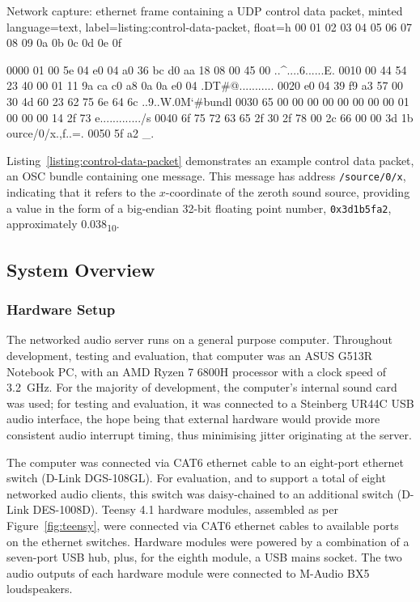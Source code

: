 \documentclass[utf8]{FrontiersinHarvard}
\newcommand{\figref}[1]{Figure~\ref{#1}}
\newcommand{\lstref}[1]{Listing~\ref{#1}}
\newcommand{\numDec}[1]{\num{#1}\textsubscript{10}}
\begin{document}
    \begin{codelisting}{
        Network capture: ethernet frame containing a UDP control data packet,
        minted language=text,
        label=listing:control-data-packet,
        float=h
    }
       00 01 02 03 04 05 06 07  08 09 0a 0b 0c 0d 0e 0f

0000   01 00 5e 04 e0 04 a0 36  bc d0 aa 18 08 00 45 00   ..^....6......E.
0010   00 44 54 23 40 00 01 11  9a ca c0 a8 0a 0a e0 04   .DT#@...........
0020   e0 04 39 f9 a3 57 00 30  4d 60 23 62 75 6e 64 6c   ..9..W.0M`#bundl
0030   65 00 00 00 00 00 00 00  00 01 00 00 00 14 2f 73   e............./s
0040   6f 75 72 63 65 2f 30 2f  78 00 2c 66 00 00 3d 1b   ource/0/x.,f..=.
0050   5f a2                                              _.
    \end{codelisting}

    \lstref{listing:control-data-packet} demonstrates an example control data
    packet, an OSC bundle containing one message.
    This message has address \texttt{/source/0/x}, indicating that it refers to the
    $x$-coordinate of the zeroth sound source, providing a value in the form of a
    big-endian 32-bit floating point number, \texttt{0x3d1b5fa2}, approximately
    \numDec{0.038}.

    \subsection{System Overview}\label{subsec:system-overview}

    \subsubsection{Hardware Setup}

    The networked audio server runs on a general purpose computer.
    Throughout development, testing and evaluation, that computer was an ASUS
    G513R Notebook PC, with an AMD Ryzen 7 6800H processor with a clock
    speed of \qty{3.2}{\GHz}.
    For the majority of development, the computer's internal sound card was
    used; for testing and evaluation, it was connected to a Steinberg UR44C USB
    audio interface, the hope being that external hardware would provide more
    consistent audio interrupt timing, thus minimising jitter originating at the
    server.

    The computer was connected via CAT6 ethernet cable to an eight-port ethernet
    switch (D-Link DGS-108GL).
    For evaluation, and to support a total of eight networked audio clients, this
    switch was daisy-chained to an additional switch (D-Link DES-1008D).
    Teensy 4.1 hardware modules, assembled as per \figref{fig:teensy}, were
    connected via CAT6 ethernet cables to available ports on the ethernet switches.
    Hardware modules were powered by a combination of a seven-port USB hub, plus,
    for the eighth module, a USB mains socket.
    The two audio outputs of each hardware module were connected to M-Audio BX5
    loudspeakers.
\end{document}
